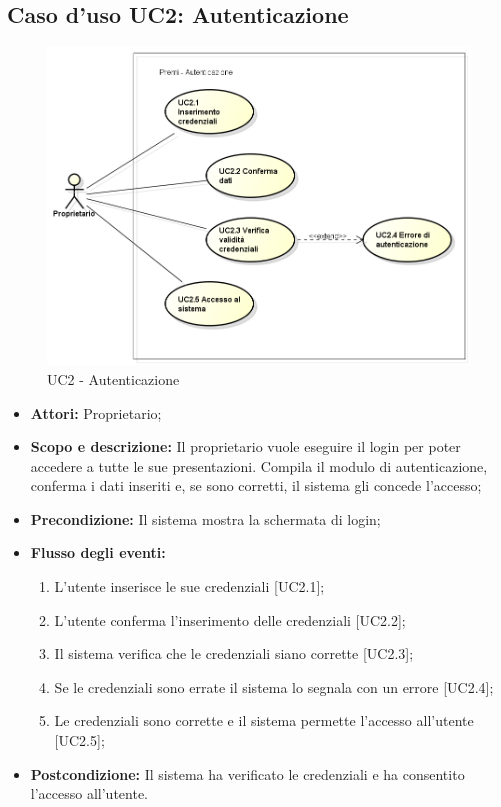 \subsection{Caso d'uso UC2: Autenticazione}
\begin{figure}[h] 
	\centering 
	\includegraphics[scale=0.45] {img/UC2.png} 
	\caption{UC2 - Autenticazione} 
\end{figure}

\begin{itemize}
	\item \textbf{Attori:} Proprietario;
	\item \textbf{Scopo e descrizione:} Il proprietario vuole eseguire il login per poter accedere a tutte le sue presentazioni. Compila il modulo di autenticazione, conferma i dati inseriti e, se sono corretti, il sistema gli concede l'accesso;
	\item \textbf{Precondizione:} Il sistema mostra la schermata di login;
	\item \textbf{Flusso degli eventi:}
	\begin{enumerate}
		\item L'utente inserisce le sue credenziali [UC2.1];
		\item L'utente conferma l'inserimento delle credenziali [UC2.2];
		\item Il sistema verifica che le credenziali siano corrette [UC2.3];
		\item Se le credenziali sono errate il sistema lo segnala con un errore [UC2.4];
		\item Le credenziali sono corrette e il sistema permette l'accesso all'utente [UC2.5];
	\end{enumerate}
	\item \textbf{Postcondizione:} Il sistema ha verificato le credenziali e ha consentito l'accesso all'utente.
\end{itemize}

